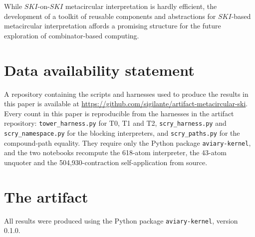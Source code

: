 \documentclass[review]{jfp-epi}
\begin{document}
While $SKI$-on-$SKI$ metacircular interpretation is hardly efficient,
the development of a toolkit of reusable components and abstractions for
$SKI$-based metacircular interpretation affords a promising structure
for the future exploration of combinator-based computing.

\section*{Data availability statement}

A repository containing the scripts and harnesses used to produce the
results in this paper is available at
\url{https://github.com/sigilante/artifact-metacircular-ski}.
Every count in this paper is reproducible from the harnesses in the
artifact repository: \texttt{tower\_harness.py} for T0, T1 and T2,
\texttt{scry\_harness.py} and \texttt{scry\_namespace.py} for the
blocking interpreters, and \texttt{scry\_paths.py} for the compound-path
equality.  They require only the Python package \texttt{aviary-kernel},
and the two
notebooks recompute the 618-atom interpreter, the 43-atom unquoter and
the 504,930-contraction self-application from source.





\appendix

\section{The artifact}\label{app:artifact}

All results were produced %
using
the Python package \texttt{aviary-kernel}, version 0.1.0. %
\end{document}

